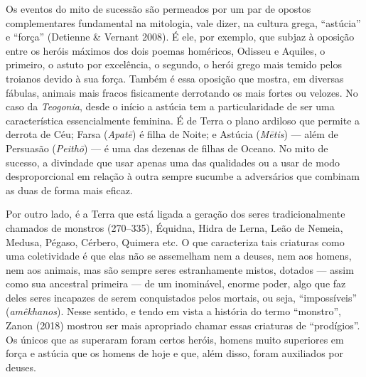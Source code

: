Os eventos do mito de sucessão são permeados por um par de opostos
complementares fundamental na mitologia, vale dizer, na cultura grega,
``astúcia'' e ``força'' (Detienne \& Vernant 2008). É ele, por exemplo,
que subjaz à oposição entre os heróis máximos dos dois poemas homéricos,
Odisseu e Aquiles, o primeiro, o astuto por excelência, o segundo, o
herói grego mais temido pelos troianos devido à sua força. Também é essa
oposição que mostra, em diversas fábulas, animais mais fracos
fisicamente derrotando os mais fortes ou velozes. No caso da
\emph{Teogonia}, desde o início a astúcia tem a particularidade de ser
uma característica essencialmente feminina. É de Terra o plano ardiloso
que permite a derrota de Céu; Farsa (\emph{Apatē}) é filha de Noite; e
Astúcia (\emph{Mētis}) --- além de Persuasão (\emph{Peithō}) --- é uma das
dezenas de filhas de Oceano. No mito de sucesso, a divindade que usar
apenas uma das qualidades ou a usar de modo desproporcional em relação à
outra sempre sucumbe a adversários que combinam as duas de forma mais
eficaz.

Por outro lado, é a Terra que está ligada a geração dos seres
tradicionalmente chamados de monstros (270--335), Équidna, Hidra de
Lerna, Leão de Nemeia, Medusa, Pégaso, Cérbero, Quimera etc. O que
caracteriza tais criaturas como uma coletividade é que elas não se
assemelham nem a deuses, nem aos homens, nem aos animais, mas são sempre
seres estranhamente mistos, dotados --- assim como sua ancestral primeira
--- de um inominável, enorme poder, algo que faz deles seres incapazes de
serem conquistados pelos mortais, ou seja, ``impossíveis''
(\emph{amêkhanos}). Nesse sentido, e tendo em vista a história do termo
``monstro'', Zanon (2018) mostrou ser mais apropriado chamar essas
criaturas de ``prodígios''. Os únicos que as superaram foram certos
heróis, homens muito superiores em força e astúcia que os homens de hoje
e que, além disso, foram auxiliados por deuses.


